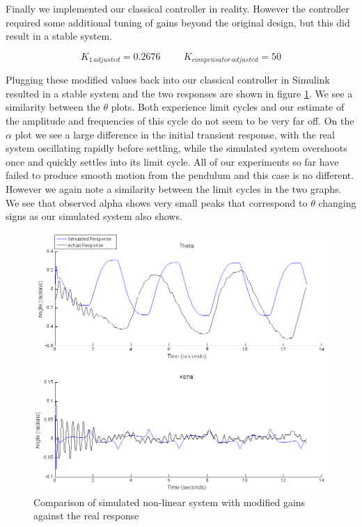 \documentclass{article}
\theoremstyle{plain}
\theoremstyle{definition}
\theoremstyle{remark}
\begin{document}
Finally we implemented our classical controller in reality.  However the controller required some additional tuning of gains beyond the original design, but this did result in a stable system.

$$K_{1 \, adjusted} = 0.2676 \hspace{1cm} K_{compensator \, adjusted} = 50 $$

Plugging these modified values back into our classical controller in Simulink resulted in a stable system and the two responses are shown in figure \ref{classicalSimulinkvsReal}.  We see a similarity between the $\theta$ plots.  Both experience limit cycles and our estimate of the amplitude and frequencies of this cycle do not seem to be very far off.  On the $\alpha$ plot we see a large difference in the initial transient response, with the real system oscillating rapidly before settling, while the simulated system overshoots once and quickly settles into its limit cycle.  All of our experiments so far have failed to produce smooth motion from the pendulum and this case is no different.  However we again note a similarity between the limit cycles in the two graphs.  We see that observed alpha shows very small peaks that correspond to $\dot{\theta}$ changing signs as our simulated system also shows. 

\begin{figure}
\begin{center}
\includegraphics[width = 16cm]{modifiedrealvsSimulation.png}
\end{center}
\caption{Comparison of simulated non-linear system with modified gains against the real response}
\label{classicalSimulinkvsReal}
\end{figure}
\end{document}
